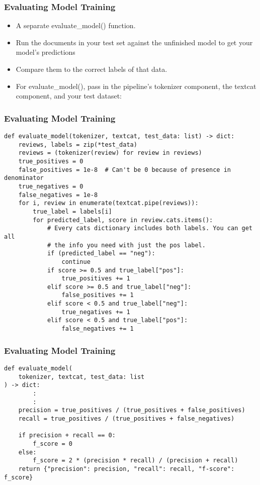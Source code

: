 \begin{frame}[fragile]\frametitle{Evaluating Model Training }

\begin{itemize}
\item A separate evaluate\_model() function.
\item Run the documents in your test set against the unfinished model to get your model’s predictions 
\item Compare them to the correct labels of that data.
\item For evaluate\_model(), pass in the pipeline’s tokenizer component, the textcat component, and your test dataset:
\end{itemize}

\end{frame}

\begin{frame}[fragile]\frametitle{Evaluating Model Training }

\begin{lstlisting}
def evaluate_model(tokenizer, textcat, test_data: list) -> dict:
    reviews, labels = zip(*test_data)
    reviews = (tokenizer(review) for review in reviews)
    true_positives = 0
    false_positives = 1e-8  # Can't be 0 because of presence in denominator
    true_negatives = 0
    false_negatives = 1e-8
    for i, review in enumerate(textcat.pipe(reviews)):
        true_label = labels[i]
        for predicted_label, score in review.cats.items():
            # Every cats dictionary includes both labels. You can get all
            # the info you need with just the pos label.
            if (predicted_label == "neg"):
                continue
            if score >= 0.5 and true_label["pos"]:
                true_positives += 1
            elif score >= 0.5 and true_label["neg"]:
                false_positives += 1
            elif score < 0.5 and true_label["neg"]:
                true_negatives += 1
            elif score < 0.5 and true_label["pos"]:
                false_negatives += 1
\end{lstlisting}

\end{frame}

\begin{frame}[fragile]\frametitle{Evaluating Model Training }

\begin{lstlisting}
def evaluate_model(
    tokenizer, textcat, test_data: list
) -> dict:
		:
		:
    precision = true_positives / (true_positives + false_positives)
    recall = true_positives / (true_positives + false_negatives)

    if precision + recall == 0:
        f_score = 0
    else:
        f_score = 2 * (precision * recall) / (precision + recall)
    return {"precision": precision, "recall": recall, "f-score": f_score}								
\end{lstlisting}

\end{frame}

